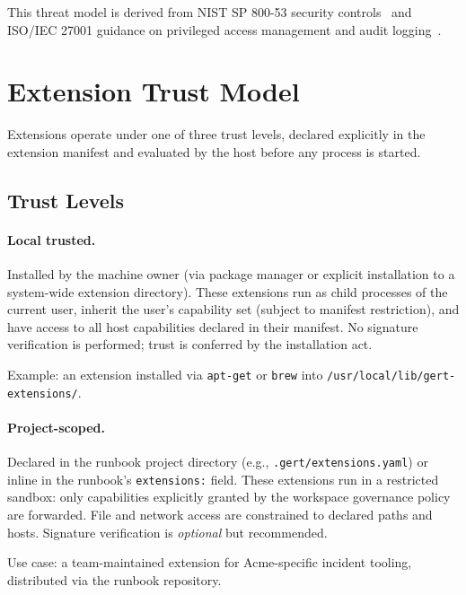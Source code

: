 This threat model is derived from NIST SP 800-53 security controls~\cite{nist-sp800-53}
and ISO/IEC 27001 guidance on privileged access management and audit logging~\cite{iso27001}.

\section{Extension Trust Model}
\label{sec:extension-trust}

Extensions operate under one of three trust levels, declared explicitly in the
extension manifest and evaluated by the host before any process is started.

\subsection{Trust Levels}

\paragraph{Local trusted.}
Installed by the machine owner (via package manager or explicit installation to
a system-wide extension directory).  These extensions run as child processes of
the current user, inherit the user's capability set (subject to manifest
restriction), and have access to all host capabilities declared in their
manifest.  No signature verification is performed; trust is conferred by the
installation act.

Example: an extension installed via \texttt{apt-get} or \texttt{brew} into
\texttt{/usr/local/lib/gert-extensions/}.

\paragraph{Project-scoped.}
Declared in the runbook project directory (e.g.,
\texttt{.gert/extensions.yaml}) or inline in the runbook's \texttt{extensions:}
field.  These extensions run in a restricted sandbox: only capabilities
explicitly granted by the workspace governance policy are forwarded.  File and
network access are constrained to declared paths and hosts.  Signature
verification is \emph{optional} but recommended.

Use case: a team-maintained extension for Acme-specific incident tooling,
distributed via the runbook repository.


